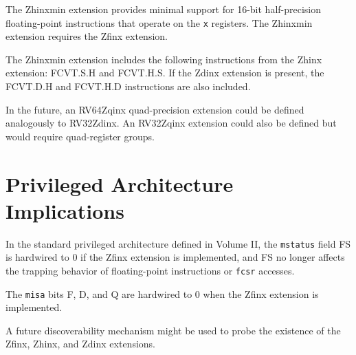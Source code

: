 The Zhinxmin extension provides minimal support for 16-bit half-precision
floating-point instructions that operate on the {\tt x} registers.
The Zhinxmin extension requires the Zfinx extension.

The Zhinxmin extension includes the following instructions from the Zhinx
extension: FCVT.S.H and FCVT.H.S.
If the Zdinx extension is present, the FCVT.D.H and FCVT.H.D instructions are
also included.

\begin{commentary}
In the future, an RV64Zqinx quad-precision extension could be defined analogously
to RV32Zdinx.
An RV32Zqinx extension could also be defined but would require
quad-register groups.
\end{commentary}

\section{Privileged Architecture Implications}

In the standard privileged architecture defined in Volume II, the
{\tt mstatus} field FS is hardwired to 0 if the Zfinx extension is
implemented, and FS no longer affects the trapping behavior of
floating-point instructions or {\tt fcsr} accesses.

The {\tt misa} bits F, D, and Q are hardwired to 0 when the Zfinx
extension is implemented.

\begin{commentary}
A future discoverability mechanism might be used to probe the existence
of the Zfinx, Zhinx, and Zdinx extensions.
\end{commentary}
